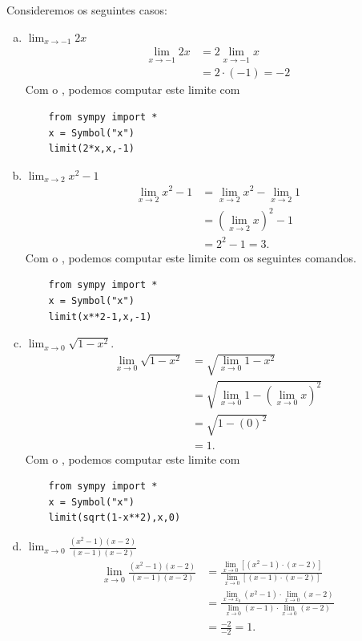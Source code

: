 \begin{ex}
  Consideremos os seguintes casos:
  \begin{enumerate}[a)]
  \item $\displaystyle \lim_{x\to -1} 2x$
  \begin{align}
    \lim_{x\to -1} 2x &= 2\lim_{x\to -1} x\\
    &= 2\cdot(-1) = -2
  \end{align}
  \ifispython
  Com o {\sympy}, podemos computar este limite com
  \begin{lstlisting}
    from sympy import *
    x = Symbol("x")
    limit(2*x,x,-1)
  \end{lstlisting}
  \fi
\item $\displaystyle \lim_{x\to 2} x^2 - 1$
  \begin{align}
    \lim_{x\to 2} x^2 - 1 &= \lim_{x\to 2} x^2 - \lim_{x\to 2} 1\\
                          &= \left(\lim_{x\to 2} x\right)^2 - 1\\
                          &= 2^2 - 1 = 3.
  \end{align}
  \ifispython
  Com o {\sympy}, podemos computar este limite com os seguintes comandos.
  \begin{lstlisting}
    from sympy import *
    x = Symbol("x")
    limit(x**2-1,x,-1)
  \end{lstlisting}
  \fi
\item $\displaystyle \lim_{x\to 0} \sqrt{1-x^2}$.
  \begin{align}
    \lim_{x\to 0} \sqrt{1-x^2} &= \sqrt{\lim_{x\to 0} 1-x^2}\\
                                &= \sqrt{\lim_{x\to 0} 1 - \left(\lim_{x\to 0} x\right)^2}\\
                                &= \sqrt{1 - (0)^2} \\
                                &= 1.
  \end{align}
  \ifispython
  Com o {\sympy}, podemos computar este limite com
  \begin{lstlisting}
    from sympy import *
    x = Symbol("x")
    limit(sqrt(1-x**2),x,0)
  \end{lstlisting}
  \fi  
\item $\displaystyle \lim_{x\to 0} \frac{(x^2-1)(x-2)}{(x-1)(x-2)}$
  \begin{align}
    \lim_{x\to 0} \frac{(x^2-1)(x-2)}{(x-1)(x-2)} &= \frac{\displaystyle\lim_{x\to 0}\left[(x^2-1)\cdot(x-2)\right]}{\displaystyle\lim_{x\to 0} \left[(x-1)\cdot(x-2)\right]}\\
                                                  &= \frac{\displaystyle\lim_{x\to x_0} (x^2-1)\cdot\lim_{x\to 0}(x-2)}{\displaystyle\lim_{x\to 0}(x-1)\cdot\lim_{x\to 0}(x-2)}\\
    &= \frac{-2}{-2} = 1.
  \end{align}
  \end{enumerate}
\end{ex}


